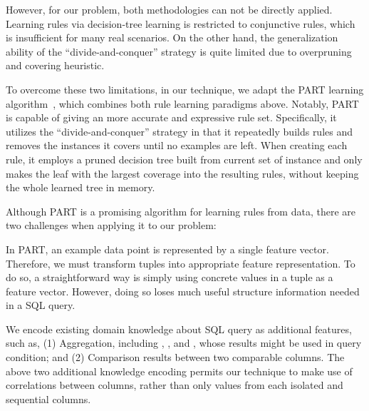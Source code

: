\vspace{1mm}

However, for our problem, both methodologies can not be directly applied.
Learning rules via decision-tree learning is restricted to conjunctive rules,
which is insufficient for many real scenarios. On the
other hand, the generalization ability of the ``divide-and-conquer'' strategy
is quite limited due to overpruning and covering heuristic.

To overcome these two limitations, in our technique, we adapt
the PART learning algorithm~\cite{Frank:1998}, which combines both
rule learning paradigms above. Notably, PART is capable of giving an more
accurate and expressive rule set. Specifically, it utilizes the
``divide-and-conquer'' strategy in that it repeatedly builds rules
and removes the instances it covers until no examples are left.
When creating each rule, it employs a pruned decision tree built from
current set of instance and only makes the leaf with the largest coverage
into the resulting rules, without keeping the whole learned tree in memory.



Although PART is a promising algorithm for learning rules from data,
there are two challenges when applying it to our problem:


\vspace{1mm}
In PART, an example data point is represented by a single feature vector.
Therefore, we must transform tuples into appropriate feature representation.
To do so, a straightforward way is simply using concrete values in a tuple
as a feature vector. However, doing so loses much useful structure information
needed in a SQL query.

\vspace{1mm}
We encode existing domain knowledge about SQL query as additional
features, such as, (1) Aggregation, including , ,
 and , whose results might be used in query condition;
and (2) Comparison results between two comparable columns.
The above two additional knowledge encoding permits our technique
to make use of correlations between columns, rather than only values
from each isolated and sequential columns.

